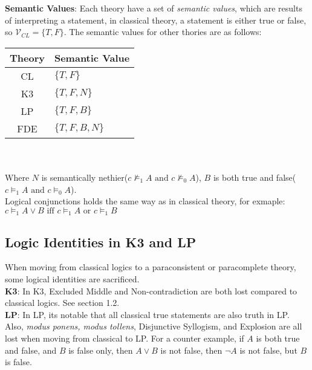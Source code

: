 \documentclass{article}
\begin{document}
\bigskip
\noindent \textbf{Semantic Values}: Each theory have a set of \emph{semantic values}, which are results of 
interpreting a statement, in classical theory, a statement is either true or false, so $\mathcal{V}_{CL} = \{T, F\}$. The 
semantic values for other thories are as follows:\\

\begin{tabular}{c|l}
    Theory & Semantic Value\\
    \hline
    CL & $\{T, F\}$\\
    K3 & $\{T, F, N\}$\\
    LP & $\{T, F, B\}$\\
    FDE & $\{T, F, B, N\}$\\

\end{tabular}\\\\
Where $N$ is semantically nethier($c \not \models_1 A \text{ and } c \not \models_0 A$), $B$ is both true and false($c  \models_1 A \text{ and } c  \models_0 A$).\\
Logical conjunctions holds the same way as in classical theory, for exmaple: \\$c \models_1 A\vee B \text{ iff } c\models_1 A \text{ or } c\models_1 B $

\newpage
\subsection{Logic Identities in K3 and LP}
When moving from classical logics to a paraconsistent or paracomplete theory, some logical identities are sacrificed.\\

\noindent \textbf{K3}: In K3, Excluded Middle and Non-contradiction are both lost compared to classical logics. See section 1.2.\\

\noindent \textbf{LP}: In LP, its notable that all classical true statements are also truth in LP. Also,
\emph{modus ponens, modus tollens}, Disjunctive Syllogism, and Explosion are all lost when moving from classical to LP.
For a counter example, if $A$ is both true and false, and $B$ is false only, then $A\vee B$ is not false, 
then $\lnot A$ is not false, but $B$ is false.\\
\end{document}
